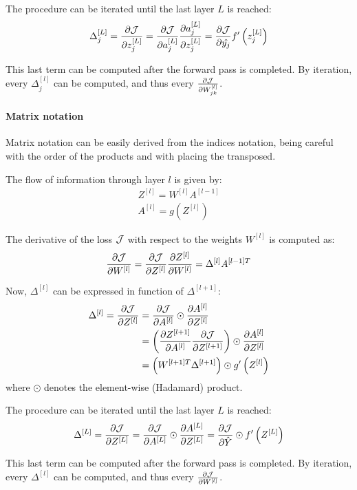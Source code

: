 The procedure can be iterated until the last layer $L$ is reached:
\begin{align*}
    \Delta_j^{[L]} = \pdv{\mathcal{J}}{z_j^{[L]}} = \pdv{\mathcal{J}}{a_j^{[L]}} \pdv{a_j^{[L]}}{z_j^{[L]}} = \pdv{\mathcal{J}}{\hat{y_j}} f'\left(z_j^{[L]}\right)
\end{align*}

This last term can be computed after the forward pass is completed. By iteration, every $\Delta_j^{[l]}$ can be computed, and thus every $\pdv{\mathcal{J}}{W_{jk}^{[l]}}$.

\paragraph{Matrix notation} Matrix notation can be easily derived from the indices notation, being careful with the order of the products and with placing the transposed.

The flow of information through layer $l$ is given by:
\begin{gather*}
    Z^{[l]} = W^{[l]} A^{[l-1]}\\
    A^{[l]} = g\left(Z^{[l]}\right)
\end{gather*}

The derivative of the loss $\mathcal{J}$ with respect to the weights $W^{[l]}$ is computed as:
\begin{equation*}
    \pdv{\mathcal{J}}{W^{[l]}} = \pdv{\mathcal{J}}{Z^{[l]}} \pdv{Z^{[l]}}{W^{[l]}} = \Delta^{[l]} A^{[l-1]T}
\end{equation*}

Now, $\Delta^{[l]}$ can be expressed in function of $\Delta^{[l + 1]}$:
\begin{align*}
    \Delta^{[l]} = \pdv{\mathcal{J}}{Z^{[l]}} &= \pdv{\mathcal{J}}{A^{[l]}} \odot \pdv{A^{[l]}}{Z^{[l]}}\\
    &= \left(\pdv{Z^{[l+1]}}{A^{[l]}} \pdv{\mathcal{J}}{Z^{[l+1]}} \right) \odot \pdv{A^{[l]}}{Z^{[l]}}\\
    &= \left(W^{[l+1]T} \Delta^{[l+1]} \right) \odot g'\left(Z^{[l]}\right)
\end{align*}
where $\odot$ denotes the element-wise (Hadamard) product.

The procedure can be iterated until the last layer $L$ is reached:
\begin{align*}
    \Delta^{[L]} = \pdv{\mathcal{J}}{Z^{[L]}} = \pdv{\mathcal{J}}{A^{[L]}} \odot \pdv{A^{[L]}}{Z^{[L]}} = \pdv{\mathcal{J}}{\hat{Y}} \odot f'\left(Z^{[L]}\right)
\end{align*}

This last term can be computed after the forward pass is completed. By iteration, every $\Delta^{[l]}$ can be computed, and thus every $\pdv{\mathcal{J}}{W^{[l]}}$.
